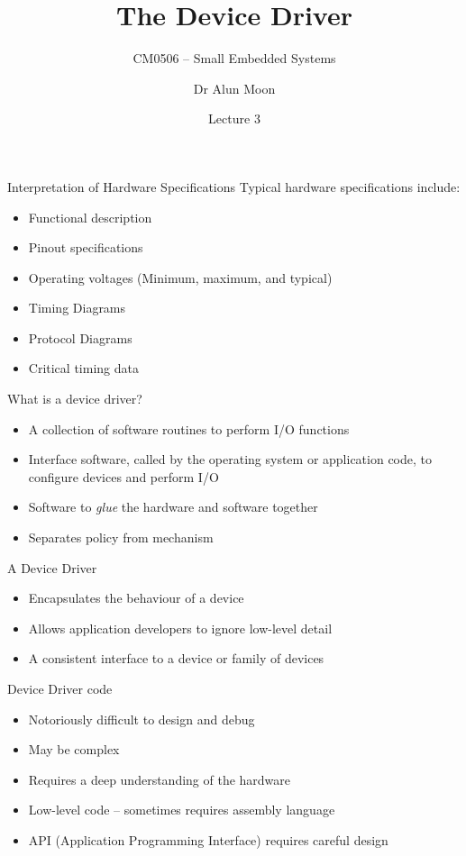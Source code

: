 \documentclass[svgnames,x11names]{beamer}
\title{The Device Driver}
\subtitle{CM0506 -- Small Embedded Systems}
\date{Lecture 3}
\author{Dr Alun Moon}
\institute{Department of Computer and Information Science}
\begin{document}
\frame\maketitle

\begin{frame}{Interpretation of Hardware Specifications}
Typical hardware specifications include:
\begin{itemize}
\item Functional description
\item Pinout specifications
\item Operating voltages (Minimum, maximum, and typical)
\item Timing Diagrams
\item Protocol Diagrams
\item Critical timing data
\end{itemize}
\end{frame}

\begin{frame}{What is a \alert{device driver}?}
  \begin{itemize}
  \item A collection of software routines to perform I/O functions
  \item Interface software, called by the operating system or
    application code, to configure devices and perform I/O
  \item Software to \emph{glue} the hardware and software together
  \item Separates policy from mechanism
  \end{itemize}
\end{frame}

\begin{frame}{A Device Driver}
  \begin{itemize}
  \item Encapsulates the behaviour of a device
  \item Allows application developers to ignore low-level detail
  \item A consistent interface to a device or family of devices
  \end{itemize}
\end{frame}

\begin{frame}{Device Driver code}
  \begin{itemize}
  \item Notoriously difficult to design and debug
  \item May be complex
  \item Requires a deep understanding of the hardware
  \item Low-level code -- sometimes requires assembly language
  \item API (Application Programming Interface) requires careful design
  \end{itemize}
\end{frame}
\end{document}
